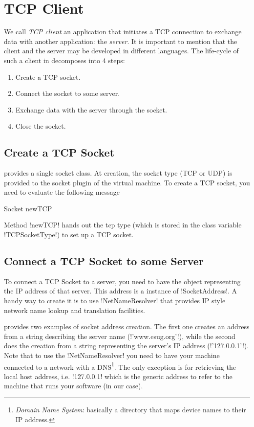 \documentclass[a4paper,10pt,twoside]{book}
\begin{document}
\section{TCP Client}
\label{sec:clientTcpSocket}
We call \textit{TCP client}  an application that initiates a TCP connection to exchange data with another application: the \textit{server}.
It is important to mention that the client and the server may be developed in different languages.
The life-cycle of such a client in \pharo decomposes into 4 steps:
\begin{enumerate}
\item Create a TCP socket.
\item Connect the socket to some server.
\item Exchange data with the server through the socket.
\item Close the socket.
\end{enumerate}

\subsection{Create a TCP Socket}
\pharo provides a single socket class.
At creation, the socket type (TCP or UDP) is provided to the socket plugin of the virtual machine.
To create a TCP socket, you need to evaluate the following message 
\begin{code}{}
Socket newTCP
\end{code}
Method \ct!newTCP! hands out the tcp type (which is stored in the class variable \ct!TCPSocketType!) to set up a TCP socket.

\subsection{Connect a TCP Socket to some Server}
To connect a TCP Socket to a server, you need to have the object representing the IP address of that server. This address is a instance of \ct!SocketAddress!.
A handy way to create it is to use \ct!NetNameResolver! that  provides IP style network name lookup and translation facilities.

 provides two examples of socket address creation.
The first one creates an address from a string describing the server name (\ct!'www.esug.org'!), while the second does the creation from a string representing the server's IP address (\ct!'127.0.0.1'!).
Note that to use the \ct!NetNameResolver! you need to have your machine connected to a network with a DNS\footnote{\emph{Domain Name System}: basically a directory that maps device names to their IP address.}.
The only exception is for retrieving the local host address, i.e. \ct!127.0.0.1! which is the generic address to refer to the machine that runs your software (\pharo in our case).
\end{document}
